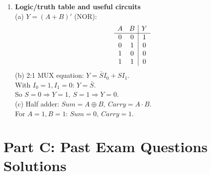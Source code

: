\documentclass[11pt]{article}
\begin{document}
\begin{enumerate}[label=\textbf{B\arabic*.}]
  \item \textbf{Logic/truth table and useful circuits}\\
  (a) \(Y=(A+B)'\) (NOR):
  \[
  \begin{array}{c c|c}
  A & B & Y\\\hline
  0 & 0 & 1\\
  0 & 1 & 0\\
  1 & 0 & 0\\
  1 & 1 & 0
  \end{array}
  \]
  (b) 2:1 MUX equation: \(Y=\bar{S}I_0 + SI_1\).\\
  With \(I_0=1, I_1=0\): \(Y=\bar{S}\).\\
  So \(S=0\Rightarrow Y=1,\ S=1\Rightarrow Y=0\).\\
  (c) Half adder: \(Sum=A\oplus B,\ Carry=A\cdot B\).\\
  For \(A=1,B=1\): \(\boxed{Sum=0,\ Carry=1}\).
\end{enumerate}


\section*{Part C: Past Exam Questions Solutions}
\end{document}
